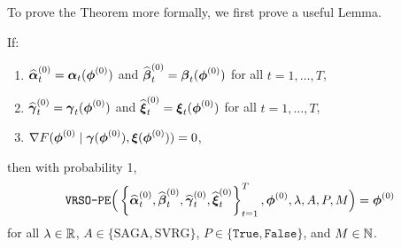 To prove the Theorem more formally, we first prove a useful Lemma.

\begin{lemma}
    If:
    \begin{enumerate}
        \item $\widehat {\boldsymbol{\alpha}}^{(0)}_t = \boldsymbol{\alpha}_t(\boldsymbol{\phi}^{(0)})$ and $\widehat {\boldsymbol{\beta}}^{(0)}_{t} = \boldsymbol{\beta}_t(\boldsymbol{\phi}^{(0)})$ for all $t = 1,\ldots,T$,
        \item $\widehat {\boldsymbol{\gamma}}^{(0)}_{t} = \boldsymbol{\gamma}_t(\boldsymbol{\phi}^{(0)})$ and $\widehat {\boldsymbol{\xi}}^{(0)}_{t} = \boldsymbol{\xi}_t(\boldsymbol{\phi}^{(0)})$ for all $t = 1,\ldots,T$,
        \item $\nabla F(\boldsymbol{\phi}^{(0)} \mid \boldsymbol{\gamma}(\boldsymbol{\phi}^{(0)}),\boldsymbol{\xi}(\boldsymbol{\phi}^{(0)})) = 0$,
    \end{enumerate}
    then with probability 1,
    \begin{equation}
        \texttt{VRSO-PE}\Big(\left\{\widehat {\boldsymbol{\alpha}}_t^{(0)},\widehat {\boldsymbol{\beta}}_t^{(0)},\widehat {\boldsymbol{\gamma}}_t^{(0)},\widehat {\boldsymbol{\xi}}_t^{(0)}\right\}_{t=1}^T, \boldsymbol{\phi}^{(0)}, \lambda, A, P, M \Big) = \boldsymbol{\phi}^{(0)}
    \end{equation}
    for all $\lambda \in \mathbb{R}$, $A \in \{\text{SAGA}, \text{SVRG}\}$, $P \in \{\texttt{True},\texttt{False}\}$, and $M \in \mathbb{N}$.
\end{lemma}

